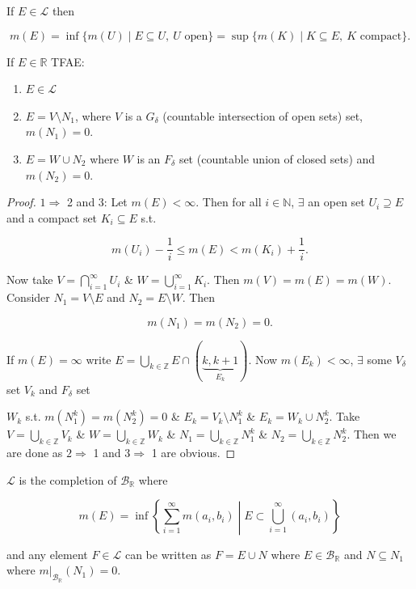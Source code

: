 \documentclass{functionspaces}
\begin{document}
\begin{proposition}
If $E \in \mathcal{L}$ then

\[
m(E) = \inf\{m(U) \mid E \subseteq U,\ U \text{ open}\} = \sup\{m(K) \mid K \subseteq E,\ K \text{ compact}\}.
\]
\end{proposition}

\begin{proposition}
If $E \in \mathbb{R}$ TFAE:

\begin{enumerate}
    \item $E \in \mathcal{L}$
    \item $E = V \setminus N_{1}$, where $V$ is a $G_{\delta}$ (countable intersection of open sets) set, $m(N_{1}) = 0$.
    \item $E = W \cup N_{2}$ where $W$ is an $F_{\delta}$ set (countable union of closed sets) and $m(N_{2}) = 0$.
\end{enumerate}
\end{proposition}

\begin{proof}
$1 \Longrightarrow$ 2 and 3: Let $m(E) < \infty$. Then for all $i \in \mathbb{N}$, $\exists$ an open set $U_{i} \supseteq E$ and a compact set $K_{i} \subseteq E$ s.t.

\[
m(U_{i}) - \frac{1}{i} \leq m(E) < m(K_{i}) + \frac{1}{i}.
\]

Now take $V = \bigcap_{i=1}^{\infty} U_{i}$ \& $W = \bigcup_{i=1}^{\infty} K_{i}$. Then $m(V) = m(E) = m(W)$. Consider $N_{1} = V \setminus E$ and $N_{2} = E \setminus W$. Then

\[
m(N_{1}) = m(N_{2}) = 0.
\]

If $m(E) = \infty$ write $E = \bigcup_{k \in \mathbb{Z}} E \cap (\underbrace{k,k+1}_{E_{k}})$. Now $m(E_{k}) < \infty$, $\exists$ some $V_{\delta}$ set $V_{k}$ and $F_{\delta}$ set

$W_{k}$ s.t. $m(N_{1}^{k}) = m(N_{2}^{k}) = 0$ \& $E_{k} = V_{k} \setminus N_{1}^{k}$ \& $E_{k} = W_{k} \cup N_{2}^{k}$. Take $V = \bigcup_{k \in \mathbb{Z}} V_{k}$ \& $W = \bigcup_{k \in \mathbb{Z}} W_{k}$ \& $N_{1} = \bigcup_{k \in \mathbb{Z}} N_{1}^{k}$ \& $N_{2} = \bigcup_{k \in \mathbb{Z}} N_{2}^{k}$. Then we are done as $2 \Longrightarrow$ 1 and $3 \Longrightarrow$ 1 are obvious.
\end{proof}

\begin{remark}
$\mathcal{L}$ is the completion of $\mathcal{B}_{\mathbb{R}}$ where

\[
m(E) = \inf\left\{\sum_{i=1}^{\infty} m(a_{i},b_{i}) \middle| E \subset \bigcup_{i=1}^{\infty} (a_{i},b_{i})\right\}
\]

and any element $F \in \mathcal{L}$ can be written as $F = E \cup N$ where $E \in \mathcal{B}_{\mathbb{R}}$ and $N \subseteq N_{1}$ where $m|_{\mathcal{B}_{\mathbb{R}}}(N_{1}) = 0$.
\end{remark}
\end{document}
